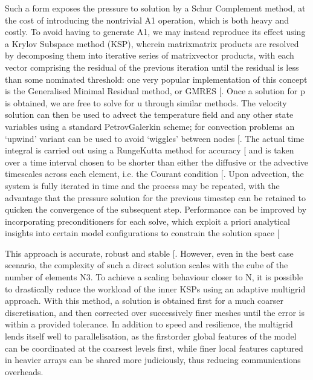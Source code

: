 \documentclass[letterpaper,10pt,english]{jupyterBook}
\begin{document}
\sphinxAtStartPar
Such a form exposes the pressure to solution by a Schur Complement method, at the cost of introducing the non\sphinxhyphen{}trivial A\sphinxhyphen{}1 operation, which is both heavy and costly. To avoid having to generate A\sphinxhyphen{}1, we may instead reproduce its effect using a Krylov Subspace method (KSP), wherein matrix\sphinxhyphen{}matrix products are resolved by decomposing them into iterative series of matrix\sphinxhyphen{}vector products, with each vector comprising the residual of the previous iteration until the residual is less than some nominated threshold: one very popular implementation of this concept is the Generalised Minimal Residual method, or GMRES {[}\sphinxcite{references:id62}{]}. Once a solution for p is obtained, we are free to solve for u through similar methods. The velocity solution can then be used to advect the temperature field and any other state variables using a standard Petrov\sphinxhyphen{}Galerkin scheme; for convection problems an ‘upwind’ variant can be used to avoid ‘wiggles’ between nodes {[}\sphinxcite{references:id59}{]}. The actual time integral is carried out using a Runge\sphinxhyphen{}Kutta method for accuracy {[}\sphinxcite{references:id60}{]} and is taken over a time interval chosen to be shorter than either the diffusive or the advective timescales across each element, i.e. the Courant condition {[}\sphinxcite{references:id63}{]}. Upon advection, the system is fully iterated in time and the process may be repeated, with the advantage that the pressure solution for the previous timestep can be retained to quicken the convergence of the subsequent step. Performance can be improved by incorporating preconditioners for each solve, which exploit a priori analytical insights into certain model configurations to constrain the solution space {[}\sphinxcite{references:id72}{]}

\sphinxAtStartPar
This approach is accurate, robust and stable {[}\sphinxcite{references:id381}{]}. However, even in the best case scenario, the complexity of such a direct solution scales with the cube of the number of elements N3. To achieve a scaling behaviour closer to N, it is possible to drastically reduce the workload of the inner KSPs using an adaptive multi\sphinxhyphen{}grid approach. With this method, a solution is obtained first for a much coarser discretisation, and then corrected over successively finer meshes until the error is within a provided tolerance. In addition to speed and resilience, the multi\sphinxhyphen{}grid lends itself well to parallelisation, as the first\sphinxhyphen{}order global features of the model can be coordinated at the coarsest levels first, while finer local features captured in heavier arrays can be shared more judiciously, thus reducing communications overheads.
\end{document}
